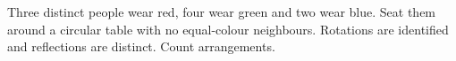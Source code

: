 Three distinct people wear red, four wear green and two wear blue. Seat them around a circular table with no equal-colour neighbours. Rotations are identified and reflections are distinct. Count arrangements.
